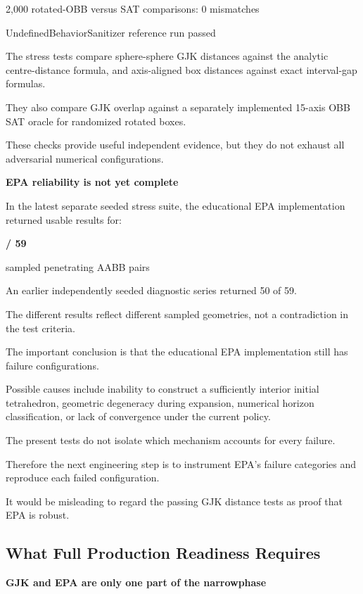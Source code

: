 2,000 rotated-OBB versus SAT comparisons: 0 mismatches

UndefinedBehaviorSanitizer reference run passed

The stress tests compare sphere-sphere GJK distances against the analytic centre-distance formula, and axis-aligned box distances against exact interval-gap formulas.

They also compare GJK overlap against a separately implemented 15-axis OBB SAT oracle for randomized rotated boxes.

These checks provide useful independent evidence, but they do not exhaust all adversarial numerical configurations.

\textbf{EPA reliability is not yet complete}

In the latest separate seeded stress suite, the educational EPA implementation returned usable results for:

\textbf{/ 59}

sampled penetrating AABB pairs

An earlier independently seeded diagnostic series returned 50 of 59.

The different results reflect different sampled geometries, not a contradiction in the test criteria.

The important conclusion is that the educational EPA implementation still has failure configurations.

Possible causes include inability to construct a sufficiently interior initial tetrahedron, geometric degeneracy during expansion, numerical horizon classification, or lack of convergence under the current policy.

The present tests do not isolate which mechanism accounts for every failure.

Therefore the next engineering step is to instrument EPA's failure categories and reproduce each failed configuration.

It would be misleading to regard the passing GJK distance tests as proof that EPA is robust.

\subsection{What Full Production Readiness Requires}\label{04-visual-computing-ii-ch026-what-full-production-readiness-requires}

\hypertarget{04-visual-computing-ii-ch026-what-full-production-readiness-requires}{}

\textbf{GJK and EPA are only one part of the narrowphase}

